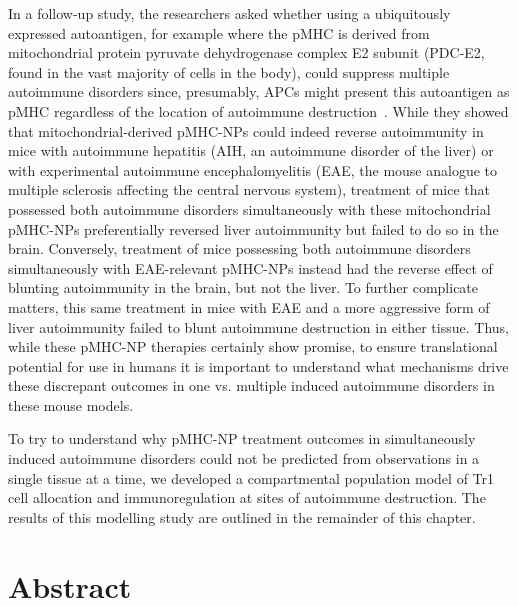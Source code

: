 In a follow-up study, the researchers asked whether using a ubiquitously expressed autoantigen, for example where the pMHC is derived from mitochondrial protein pyruvate dehydrogenase complex E2 subunit (PDC-E2, found in the vast majority of cells in the body), could suppress multiple autoimmune disorders since, presumably, APCs might present this autoantigen as pMHC regardless of the location of autoimmune destruction~\cite{umeshappa2020ubiquitous}. While they showed that mitochondrial-derived pMHC-NPs could indeed reverse autoimmunity in mice with autoimmune hepatitis (AIH, an autoimmune disorder of the liver) or with experimental autoimmune encephalomyelitis (EAE, the mouse analogue to multiple sclerosis affecting the central nervous system), treatment of mice that possessed both autoimmune disorders simultaneously with these mitochondrial pMHC-NPs preferentially reversed liver autoimmunity but failed to do so in the brain. Conversely, treatment of mice possessing both autoimmune disorders simultaneously with EAE-relevant pMHC-NPs instead had the reverse effect of blunting autoimmunity in the brain, but not the liver. To further complicate matters, this same treatment in mice with EAE and a more aggressive form of liver autoimmunity failed to blunt autoimmune destruction in either tissue. Thus, while these pMHC-NP therapies certainly show promise, to ensure translational potential for use in humans it is important to understand what mechanisms drive these discrepant outcomes in one vs. multiple induced autoimmune disorders in these mouse models.

To try to understand why pMHC-NP treatment outcomes in simultaneously induced autoimmune disorders could not be predicted from observations in a single tissue at a time, we developed a compartmental population model of Tr1 cell allocation and immunoregulation at sites of autoimmune destruction. The results of this modelling study are outlined in the remainder of this chapter. 

\newpage
\section{Abstract}

